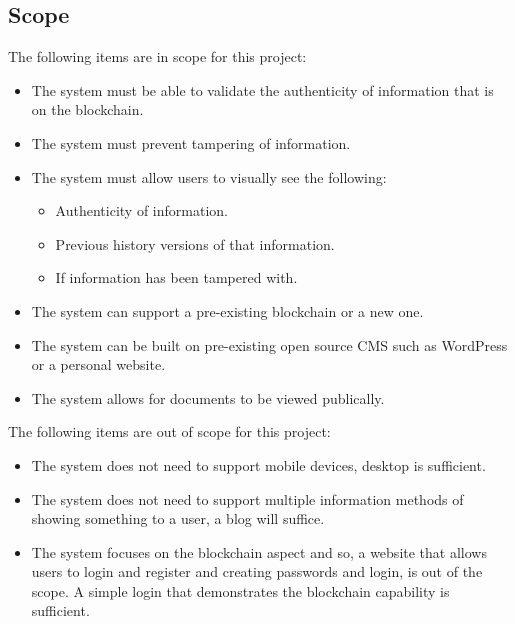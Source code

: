 \subsection{Scope}

The following items are in scope for this project:
\begin{itemize}
	\item The system must be able to validate the authenticity of information that is on the blockchain.
	\item The system must prevent tampering of information.
	\item The system must allow users to visually see the following:
	\begin{itemize}
		\item Authenticity of information.
		\item Previous history versions of that information.
		\item If information has been tampered with.
	\end{itemize}
	\item The system can support a pre-existing blockchain or a new one.
	\item The system can be built on pre-existing open source CMS such as WordPress or a personal website. 
	\item The system allows for documents to be viewed publically.
\end{itemize}
The following items are out of scope for this project:
\begin{itemize}
	\item The system does not need to support mobile devices, desktop is sufficient.
	\item The system does not need to support multiple information methods of showing something to a user,
		  a blog will suffice.
	\item The system focuses on the blockchain aspect and so, a website that allows users to login and register
		  and creating passwords and login, is out of the scope. A simple login that demonstrates the blockchain 
		  capability is sufficient.
\end{itemize}
